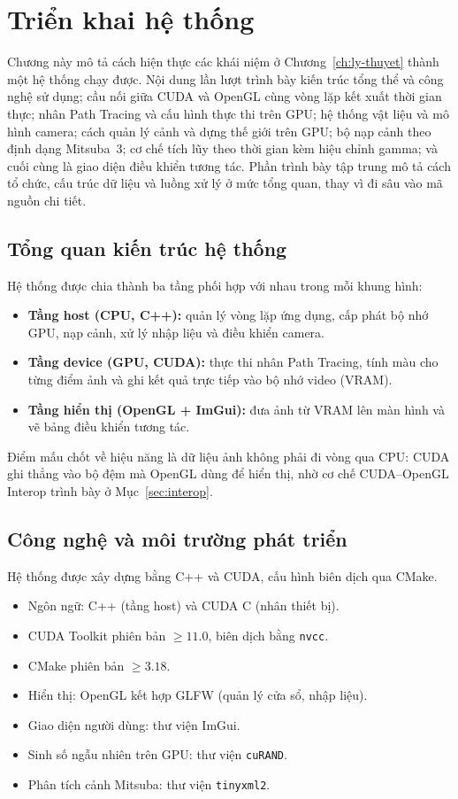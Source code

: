 \chapter{Triển khai hệ thống}
\label{ch:trien-khai}

Chương này mô tả cách hiện thực các khái niệm ở Chương~\ref{ch:ly-thuyet} thành
một hệ thống chạy được. Nội dung lần lượt trình bày kiến trúc tổng thể và công
nghệ sử dụng; cầu nối giữa CUDA và OpenGL cùng vòng lặp kết xuất thời gian thực;
nhân Path Tracing và cấu hình thực thi trên GPU; hệ thống vật liệu và mô hình
camera; cách quản lý cảnh và dựng thế giới trên GPU; bộ nạp cảnh theo định dạng
Mitsuba~3; cơ chế tích lũy theo thời gian kèm hiệu chỉnh gamma; và cuối cùng là
giao diện điều khiển tương tác. Phần trình bày tập trung mô tả cách tổ chức, cấu
trúc dữ liệu và luồng xử lý ở mức tổng quan, thay vì đi sâu vào mã nguồn chi tiết.

\section{Tổng quan kiến trúc hệ thống}
Hệ thống được chia thành ba tầng phối hợp với nhau trong mỗi khung hình:
\begin{itemize}[noitemsep]
  \item \textbf{Tầng host (CPU, C++):} quản lý vòng lặp ứng dụng, cấp phát bộ
        nhớ GPU, nạp cảnh, xử lý nhập liệu và điều khiển camera.
  \item \textbf{Tầng device (GPU, CUDA):} thực thi nhân Path Tracing, tính màu
        cho từng điểm ảnh và ghi kết quả trực tiếp vào bộ nhớ video (VRAM).
  \item \textbf{Tầng hiển thị (OpenGL + ImGui):} đưa ảnh từ VRAM lên màn hình và
        vẽ bảng điều khiển tương tác.
\end{itemize}
Điểm mấu chốt về hiệu năng là dữ liệu ảnh không phải đi vòng qua CPU:
CUDA ghi thẳng vào bộ đệm mà OpenGL dùng để hiển thị, nhờ cơ chế CUDA--OpenGL
Interop trình bày ở Mục~\ref{sec:interop}.

\section{Công nghệ và môi trường phát triển}
Hệ thống được xây dựng bằng C++ và CUDA, cấu hình biên dịch qua CMake.
\begin{itemize}[noitemsep]
  \item Ngôn ngữ: C++ (tầng host) và CUDA C (nhân thiết bị).
  \item CUDA Toolkit phiên bản $\geq 11.0$, biên dịch bằng \texttt{nvcc}.
  \item CMake phiên bản $\geq 3.18$.
  \item Hiển thị: OpenGL kết hợp GLFW (quản lý cửa sổ, nhập liệu).
  \item Giao diện người dùng: thư viện ImGui.
  \item Sinh số ngẫu nhiên trên GPU: thư viện \texttt{cuRAND}.
  \item Phân tích cảnh Mitsuba: thư viện \texttt{tinyxml2}.
\end{itemize}

